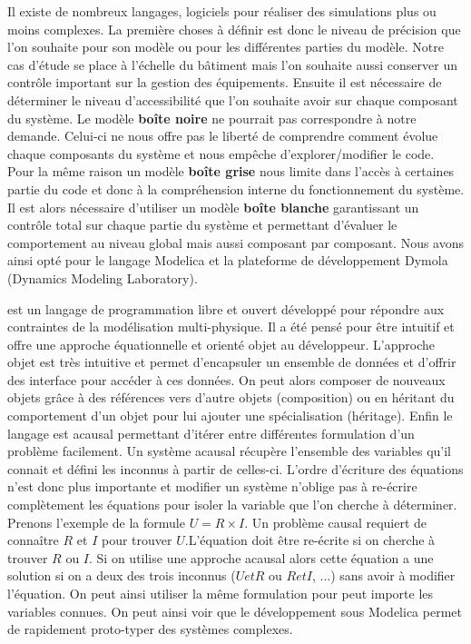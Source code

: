 Il existe de nombreux langages, logiciels pour réaliser des simulations plus ou moins complexes.
La première choses à définir est donc le niveau de précision que l’on souhaite pour son modèle ou
pour les différentes parties du modèle. Notre cas d’étude se place à l’échelle du bâtiment mais
l’on souhaite aussi conserver un contrôle important sur la gestion des équipements.
Ensuite il est nécessaire de déterminer le niveau d’accessibilité que l’on souhaite avoir
sur chaque composant du système. Le modèle \textbf{boîte noire} ne pourrait pas correspondre à notre
demande. Celui-ci ne nous offre pas le liberté de comprendre comment évolue chaque
composants du système et nous empêche d’explorer/modifier le code.
Pour la même raison un modèle \textbf{boîte grise} nous limite dans l’accès à certaines
partie du code et donc à la compréhension interne du fonctionnement du système.
Il est alors nécessaire d’utiliser un modèle \textbf{boîte blanche} garantissant
un contrôle total sur chaque partie du système et permettant d’évaluer le comportement
au niveau global mais aussi composant par composant.
Nous avons ainsi opté pour le langage Modelica et la plateforme de développement
Dymola (Dynamics Modeling Laboratory).



 est un langage de programmation libre et ouvert développé pour répondre aux
contraintes de la modélisation multi-physique. Il a été pensé pour être intuitif
et offre une approche équationnelle et orienté objet au développeur.
L’approche objet est très intuitive et permet d’encapsuler un ensemble de données
et d’offrir des interface pour accéder à ces données. On peut alors composer de nouveaux
objets grâce à des références vers d’autre objets (composition) ou en héritant
du comportement d’un objet pour lui ajouter une spécialisation (héritage).
Enfin le langage est acausal permettant d’itérer entre différentes formulation
d’un problème facilement. Un système acausal récupère l’ensemble des variables qu’il
connait et défini les inconnus à partir de celles-ci. L’ordre d’écriture des équations
n’est donc plus importante et modifier un système n’oblige pas à re-écrire complètement
les équations pour isoler la variable que l’on cherche à déterminer. Prenons l’exemple
de la formule $U = R \times I$. Un problème causal requiert de connaître $R$ et $I$
pour trouver $U$.L’équation doit être re-écrite si on cherche à trouver $R$ ou $I$.
Si on utilise une approche acausal alors cette équation a une solution si on a deux des
trois inconnus ($U et R$ ou $R et I$, ...) sans avoir à modifier l’équation. On peut ainsi utiliser
la même formulation pour peut importe les variables connues.
On peut ainsi voir que le développement sous Modelica permet de rapidement proto-typer
des systèmes complexes.




